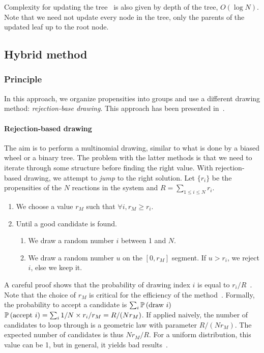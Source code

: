 Complexity for updating the tree~ is also given by depth of the tree, $O(\log N)$. Note that we need not update every node in the tree, only the parents of the updated leaf up to the root node.


\subsection {Hybrid method}

\subsubsection {Principle}

In this approach, we organize propensities into groups and use a different drawing method: \emph{rejection-base drawing}. This approach has been presented in~\citet{slepoy_constant-time_2008}.

\paragraph{Rejection-based drawing} The aim is to perform a multinomial drawing, similar to what is done by a biased wheel or a binary tree. The problem with the latter methods is that we need to iterate through some structure before finding the right value. With rejection-based drawing, we attempt to \emph{jump} to the right solution. Let $\{r_i\}$ be the propensities of the $N$ reactions in the system and $R = \sum_{1 \leq i \leq N} r_i$.
\begin{enumerate}
\item We choose a value $r_M$ such that $\forall i, r_M \geq r_i$.
\item Until a good candidate is found.
  \begin{enumerate}
  \item We draw a random number $i$ between 1 and $N$.
  \item We draw a random number $u$ on the $[0, r_M]$ segment. If $u > r_i$, we reject $i$, else we keep it.
  \end{enumerate}
\end{enumerate}

A careful proof shows that the probability of drawing index $i$ is equal to $r_i / R$~\citep{serebrinsky_physical_2011}. Note that the choice of $r_M$ is critical for the efficiency of the method~. Formally, the probability to accept a candidate is $\sum_i\mathbb{P}\left(\textrm{draw }i\right)$ $\mathbb{P}\left(\textrm{accept }i\right) = \sum_i1/N \times r_i/r_M = R/(Nr_M)$. If applied naively, the number of candidates to loop through is a geometric law with parameter $R/(Nr_M)$. The expected number of candidates is thus $Nr_M/R$. For a uniform distribution, this value can be 1, but in general, it yields bad results~.


